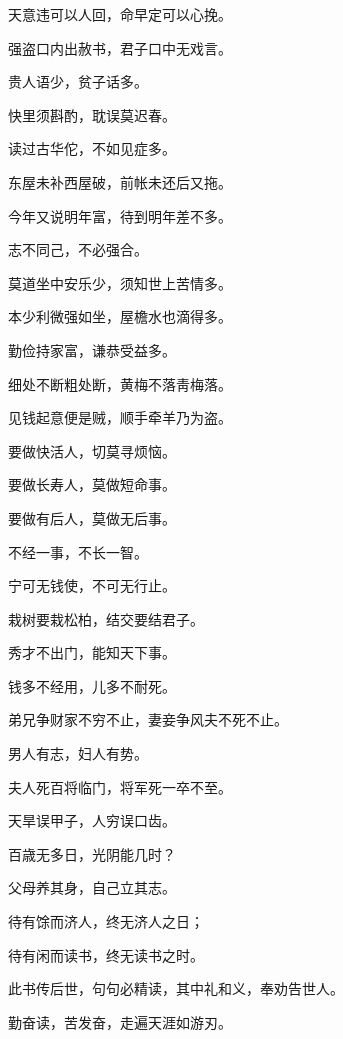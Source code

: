 \documentclass[12pt,oneside]{book}
\begin{document}
天意违可以人回，命早定可以心挽。

强盗口内出赦书，君子口中无戏言。

贵人语少，贫子话多。

快里须斟酌，耽误莫迟春。

读过古华佗，不如见症多。

东屋未补西屋破，前帐未还后又拖。

今年又说明年富，待到明年差不多。

志不同己，不必强合。

莫道坐中安乐少，须知世上苦情多。

本少利微强如坐，屋檐水也滴得多。

勤俭持家富，谦恭受益多。

细处不断粗处断，黄梅不落靑梅落。

见钱起意便是贼，顺手牵羊乃为盗。

要做快活人，切莫寻烦恼。

要做长寿人，莫做短命事。

要做有后人，莫做无后事。

不经一事，不长一智。

宁可无钱使，不可无行止。

栽树要栽松柏，结交要结君子。

秀才不出门，能知天下事。

钱多不经用，儿多不耐死。

弟兄争财家不穷不止，妻妾争风夫不死不止。

男人有志，妇人有势。

夫人死百将临门，将军死一卒不至。

天旱误甲子，人穷误口齿。

百歳无多日，光阴能几时？

父母养其身，自己立其志。

待有馀而济人，终无济人之日；

待有闲而读书，终无读书之时。

此书传后世，句句必精读，其中礼和义，奉劝告世人。

勤奋读，苦发奋，走遍天涯如游刃。








\end{document}
